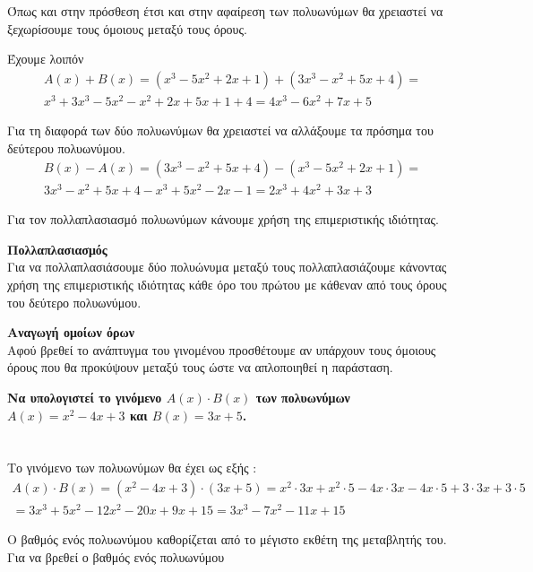 Όπως και στην πρόσθεση έτσι και στην αφαίρεση των πολυωνύμων θα χρειαστεί να ξεχωρίσουμε τους όμοιους μεταξύ τους όρους.
\begin{rlist}
\item Έχουμε λοιπόν
\begin{gather*}
A(x)+B(x)=\left( x^3-5x^2+2x+1\right) +\left( 3x^3-x^2+5x+4\right)=\\
x^3+3x^3-5x^2-x^2+2x+5x+1+4=4x^3-6x^2+7x+5
\end{gather*}
\item Για τη διαφορά των δύο πολυωνύμων θα χρειαστεί να αλλάξουμε τα πρόσημα του δεύτερου πολυωνύμου.
\begin{gather*}
B(x)-A(x)=\left( 3x^3-x^2+5x+4\right)-\left( x^3-5x^2+2x+1\right)=\\
3x^3-x^2+5x+4-x^3+5x^2-2x-1=2x^3+4x^2+3x+3
\end{gather*}
\end{rlist}
\begin{Methodos}{3cm}
Για τον πολλαπλασιασμό πολυωνύμων κάνουμε χρήση της επιμεριστικής ιδιότητας.
\begin{bhma}
\item \textbf{Πολλαπλασιασμός}\\
Για να πολλαπλασιάσουμε δύο πολυώνυμα μεταξύ τους πολλαπλασιάζουμε κάνοντας χρήση της επιμεριστικής ιδιότητας κάθε όρο του πρώτου με κάθεναν από τους όρους του δεύτερο πολυωνύμου.
\item \textbf{Αναγωγή ομοίων όρων}\\
Αφού βρεθεί το ανάπτυγμα του γινομένου προσθέτουμε αν υπάρχουν τους όμοιους όρους που θα προκύψουν μεταξύ τους ώστε να απλοποιηθεί η παράσταση.
\end{bhma}
\end{Methodos}
\textbf{Να υπολογιστεί το γινόμενο {\boldmath$ A(x)\cdot B(x) $} των πολυωνύμων {\boldmath$ A(x)=x^2-4x+3 $} και {\boldmath$ B(x)=3x+5 $}.}\\\\
\lysh\\
Το γινόμενο των πολυωνύμων θα έχει ως εξής :
\begin{gather*}
A(x)\cdot B(x)=\left( x^2-4x+3\right)\cdot(3x+5)=x^2\cdot 3x+x^2\cdot 5-4x\cdot 3x-4x\cdot 5+3\cdot 3x+3\cdot 5\\=
3x^3+5x^2-12x^2-20x+9x+15=3x^3-7x^2-11x+15
\end{gather*}
\begin{Methodos}{4cm}
Ο βαθμός ενός πολυωνύμου καθορίζεται από το μέγιστο εκθέτη της μεταβλητής του. Για να βρεθεί ο βαθμός ενός πολυωνύμου
\end{Methodos}
